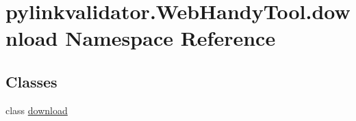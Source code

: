 \hypertarget{namespacepylinkvalidator_1_1_web_handy_tool_1_1download}{}\section{pylinkvalidator.\+Web\+Handy\+Tool.\+download Namespace Reference}
\label{namespacepylinkvalidator_1_1_web_handy_tool_1_1download}
\subsection*{Classes}
\begin{DoxyCompactItemize}
\item 
class \hyperlink{classpylinkvalidator_1_1_web_handy_tool_1_1download_1_1download}{download}
\end{DoxyCompactItemize}
